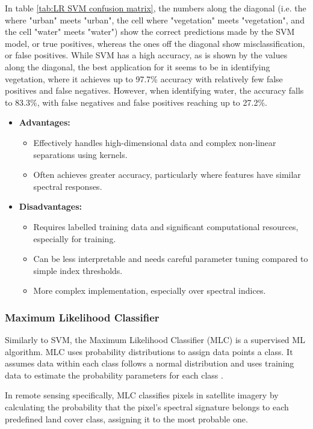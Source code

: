 In table \ref{tab:LR SVM confusion matrix}, the numbers along the diagonal (i.e. the where "urban" meets "urban", the cell where "vegetation" meets "vegetation", and the cell "water" meets "water") show the correct predictions made by the SVM model, or true positives, whereas the ones off the diagonal show misclassification, or false positives. While SVM has a high accuracy, as is shown by the values along the diagonal, the best application for it seems to be in identifying vegetation, where it achieves up to 97.7\% accuracy with relatively few false positives and false negatives. However, when identifying water, the accuracy falls to 83.3\%, with false negatives and false positives reaching up to 27.2\%. 

\begin{itemize}
    \item \textbf{Advantages:}
    \begin{itemize}
        \item Effectively handles high-dimensional data and complex non-linear separations using kernels.
        \item Often achieves greater accuracy, particularly where features have similar spectral responses.
    \end{itemize}
    \item \textbf{Disadvantages:}
    \begin{itemize}
        \item Requires labelled training data and significant computational resources, especially for training.
        \item Can be less interpretable and needs careful parameter tuning compared to simple index thresholds.
        \item More complex implementation, especially over spectral indices.
    \end{itemize}
\end{itemize}

\subsubsection{Maximum Likelihood Classifier}
Similarly to SVM, the Maximum Likelihood Classifier (MLC) is a supervised ML algorithm. MLC uses probability distributions to assign data points a class. It assumes data within each class follows a normal distribution and uses training data to estimate the probability parameters for each class \citep{arcmap_2021}. 

In remote sensing specifically, MLC classifies pixels in satellite imagery by calculating the probability that the pixel's spectral signature belongs to each predefined land cover class, assigning it to the most probable one.


